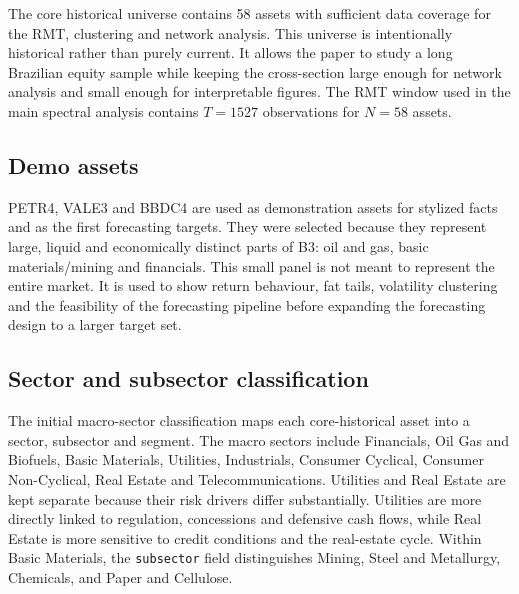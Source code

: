 The core historical universe contains 58 assets with sufficient data coverage for the RMT, clustering and network analysis. This universe is intentionally historical rather than purely current. It allows the paper to study a long Brazilian equity sample while keeping the cross-section large enough for network analysis and small enough for interpretable figures. The RMT window used in the main spectral analysis contains $T=1527$ observations for $N=58$ assets.

\subsection{Demo assets}

PETR4, VALE3 and BBDC4 are used as demonstration assets for stylized facts and as the first forecasting targets. They were selected because they represent large, liquid and economically distinct parts of B3: oil and gas, basic materials/mining and financials. This small panel is not meant to represent the entire market. It is used to show return behaviour, fat tails, volatility clustering and the feasibility of the forecasting pipeline before expanding the forecasting design to a larger target set.

\subsection{Sector and subsector classification}

The initial macro-sector classification maps each core-historical asset into a sector, subsector and segment. The macro sectors include Financials, Oil Gas and Biofuels, Basic Materials, Utilities, Industrials, Consumer Cyclical, Consumer Non-Cyclical, Real Estate and Telecommunications. Utilities and Real Estate are kept separate because their risk drivers differ substantially. Utilities are more directly linked to regulation, concessions and defensive cash flows, while Real Estate is more sensitive to credit conditions and the real-estate cycle. Within Basic Materials, the \texttt{subsector} field distinguishes Mining, Steel and Metallurgy, Chemicals, and Paper and Cellulose.

\begin{table}
\centering
\caption{Summary of the empirical samples used in the working draft.}
\label{tab:universe_summary}
\end{table}
\FloatBarrier

